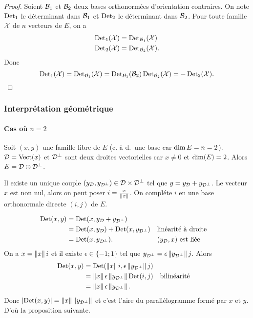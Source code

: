     \begin{proof}
      Soient \(\mathcal{B}_1\) et \(\mathcal{B}_2\) deux bases orthonormées d'orientation contraires. On note \(\operatorname{Det}_1\) le déterminant dans \(\mathcal{B}_1\) et \(\operatorname{Det}_2\) le déterminant dans \(\mathcal{B}_2\). Pour toute famille \(\mathcal{X}\) de \(n\) vecteurs de \(E\), on a
      \begin{align}
        \operatorname{Det}_1(\mathcal{X}) &= \operatorname{Det}_{\mathcal{B}_1}(\mathcal{X}) \\
        \operatorname{Det}_2(\mathcal{X}) &= \operatorname{Det}_{\mathcal{B}_2}(\mathcal{X}).
      \end{align}
      Donc
      \begin{equation}
        \operatorname{Det}_1(\mathcal{X}) = \operatorname{Det}_{\mathcal{B}_1}(\mathcal{X}) = \operatorname{Det}_{\mathcal{B}_1}(\mathcal{B}_2)\operatorname{Det}_{\mathcal{B}_2}(\mathcal{X})=-\operatorname{Det}_2(\mathcal{X}).
      \end{equation}
    \end{proof}

    \subsubsection{Interprétation géométrique}

    \paragraph{Cas où \(n=2\)}

    Soit \((x,y)\) une famille libre de \(E\) (c.-à-d.\ une base car \(\operatorname{dim} E=n=2\)). \(\mathcal{D}=\operatorname{Vect}(x)\) et \(\mathcal{D}^\perp\) sont deux droites vectorielles car \(x\neq 0\) et \(\operatorname{dim}(E)=2\). Alors \(E = \mathcal{D} \oplus \mathcal{D}^\perp\).

    Il existe un unique couple \((y_{\mathcal{D}}, y_{\mathcal{D}^\perp}) \in \mathcal{D} \times \mathcal{D}^\perp\) tel que \(y=y_{\mathcal{D}} +y_{\mathcal{D}^\perp}\). Le vecteur \(x\) est non nul, alors on peut poser \(i=\frac{x}{\left\lVert x\right\rVert}\). On compléte \(i\) en une base orthonormale directe \((i,j)\) de \(E\).

    \begin{align}
      \operatorname{Det}(x,y) &= \operatorname{Det}(x,y_{\mathcal{D}} +y_{\mathcal{D}^\perp}) \\
                &=\operatorname{Det}(x,y_{\mathcal{D}}) + \operatorname{Det}(x,y_{\mathcal{D}^\perp}) && \text{linéarité à droite} \\
                &=\operatorname{Det}(x,y_{\mathcal{D}^\perp}). && (y_{\mathcal{D}},x) \text{~est liée}
    \end{align}
    On a \(x=\left\lVert x\right\rVert i\) et il existe \(\epsilon \in \{-1;1\}\) tel que \(y_{\mathcal{D}^\perp}=\epsilon\left\lVert y_{\mathcal{D}^\perp}\right\rVert j\). Alors
    \begin{align}
      \operatorname{Det}(x,y) &=\operatorname{Det}(\left\lVert x\right\rVert i, \epsilon\left\lVert y_{\mathcal{D}^\perp}\right\rVert j) \\
                &=\left\lVert x\right\rVert \epsilon\left\lVert y_{\mathcal{D}^\perp}\right\rVert \operatorname{Det}(i,j) && \text{bilinéarité} \\
                &=\left\lVert x\right\rVert \epsilon\left\lVert y_{\mathcal{D}^\perp}\right\rVert.
    \end{align}
    Donc \(\left\lvert\operatorname{Det}(x,y)\right\rvert=\left\lVert x\right\rVert\left\lVert y_{\mathcal{D}^\perp}\right\rVert\) et c'est l'aire du parallélogramme formé par \(x\) et \(y\). D'où la proposition suivante.

